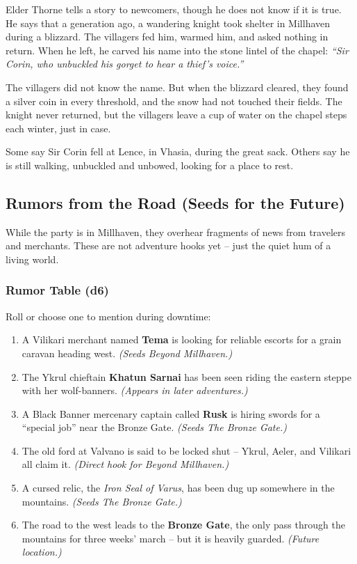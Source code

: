 \documentclass[11pt]{article}
\newenvironment{seedbox}[1]{%
  \begin{mdframed}[backgroundcolor=seedcolor!10, linewidth=1pt, linecolor=seedcolor]%
  \subsubsection*{#1}%
}{%
  \end{mdframed}%
}
\begin{document}
Elder Thorne tells a story to newcomers, though he does not know if it is true. He says that a generation ago, a wandering knight took shelter in Millhaven during a blizzard. The villagers fed him, warmed him, and asked nothing in return. When he left, he carved his name into the stone lintel of the chapel: \textit{``Sir Corin, who unbuckled his gorget to hear a thief's voice.''}

The villagers did not know the name. But when the blizzard cleared, they found a silver coin in every threshold, and the snow had not touched their fields. The knight never returned, but the villagers leave a cup of water on the chapel steps each winter, just in case.

Some say Sir Corin fell at Lence, in Vhasia, during the great sack. Others say he is still walking, unbuckled and unbowed, looking for a place to rest.

\subsection{Rumors from the Road (Seeds for the Future)}

While the party is in Millhaven, they overhear fragments of news from travelers and merchants. These are not adventure hooks yet -- just the quiet hum of a living world.

\begin{seedbox}{Rumor Table (d6)}
Roll or choose one to mention during downtime:
\begin{enumerate}
\item A Vilikari merchant named \textbf{Tema} is looking for reliable escorts for a grain caravan heading west. \textit{(Seeds Beyond Millhaven.)}
\item The Ykrul chieftain \textbf{Khatun Sarnai} has been seen riding the eastern steppe with her wolf-banners. \textit{(Appears in later adventures.)}
\item A Black Banner mercenary captain called \textbf{Rusk} is hiring swords for a ``special job'' near the Bronze Gate. \textit{(Seeds The Bronze Gate.)}
\item The old ford at Valvano is said to be locked shut -- Ykrul, Aeler, and Vilikari all claim it. \textit{(Direct hook for Beyond Millhaven.)}
\item A cursed relic, the \textit{Iron Seal of Varus}, has been dug up somewhere in the mountains. \textit{(Seeds The Bronze Gate.)}
\item The road to the west leads to the \textbf{Bronze Gate}, the only pass through the mountains for three weeks' march -- but it is heavily guarded. \textit{(Future location.)}
\end{enumerate}
\end{seedbox}
\end{document}

